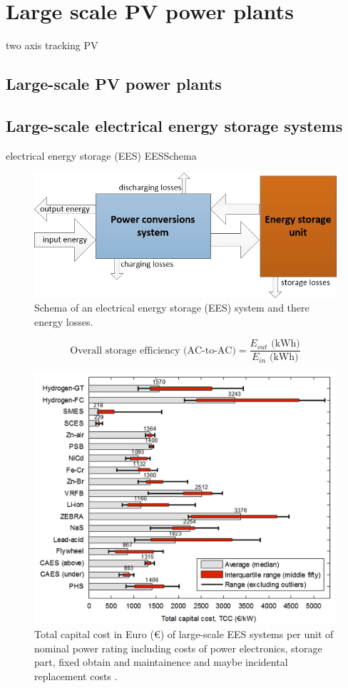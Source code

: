 \section{Large scale PV power plants}\label{Large scale photo voltaic (PV) power plants}
two axis tracking PV
\subsection{Large-scale PV power plants}

\subsection{Large-scale electrical energy storage systems}
electrical energy storage (EES)
EESSchema
\begin{figure}[htbp]  
\centering
\includegraphics[width=0.65\linewidth]{FIG/EESSchema}
\caption[Schema of an electrical energy storage (EES) system and there energy losses.]{Schema of an electrical energy storage (EES) system and there energy losses.}\label{TCC_EES}
\end{figure}

\begin{equation}
\textrm{Overall storage efficiency (AC-to-AC)} =\frac{E_{out} \textrm{ (kWh)} }{E_{in} \textrm{ (kWh)}}
\end{equation}

\begin{figure}[htbp]  
\centering
\includegraphics[width=0.75\linewidth]{FIG/TCC_EES}
\caption[Total capital cost in Euro (€) of large-scale EES systems per unit of nominal power rating including costs of power electronics, storage part, fixed obtain and maintainence and maybe incidental replacement costs.]{Total capital cost in Euro (€) of large-scale EES systems per unit of nominal power rating including costs of power electronics, storage part, fixed obtain and maintainence and maybe incidental replacement costs \cite{Zakeri2015}.}\label{TCC_EES}
\end{figure}

